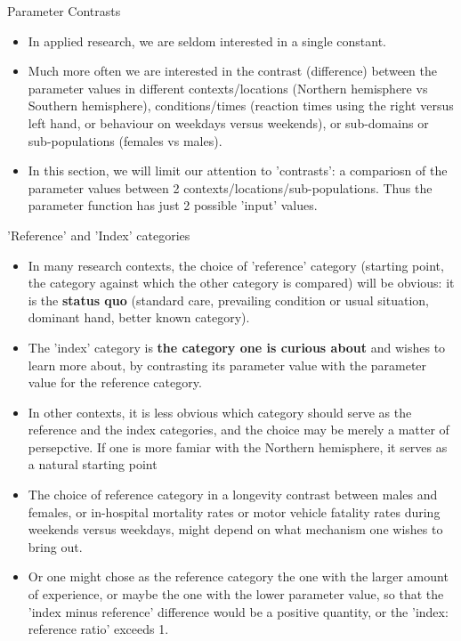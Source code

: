 \documentclass[10pt,handout]{beamer}\usepackage[]{graphicx}\usepackage[]{color}
\begin{document}
\begin{frame}{Parameter Contrasts}
	\begin{itemize}
		\item In applied research, we are seldom interested in a single constant. 
		
		
				\pause 
		
		\item Much more often we are interested in the contrast (difference) between the parameter values in different contexts/locations (Northern hemisphere vs Southern hemisphere), conditions/times (reaction times using the right versus left hand, or behaviour on weekdays versus weekends), or sub-domains or sub-populations (females vs males).
		
		\pause 
		
		\item In this section, we will limit our attention to 'contrasts': a compariosn of the parameter values between 2 contexts/locations/sub-populations. Thus the parameter function has just 2 possible 'input' values. 
	\end{itemize}
\end{frame}



\begin{frame}{'Reference' and 'Index' categories}
	\begin{itemize}
		\item In many research contexts, the choice of 'reference' category (starting point, the category against which the other category is compared) will be obvious: it is the \textbf{status quo} (standard care, prevailing condition or usual situation, dominant hand, better known category). 
		\pause 
		\item The 'index' category is \textbf{the category one is curious about} and wishes to learn more about, by contrasting its parameter value with the parameter value for the reference category.
		\pause 		
		\item In other contexts, it is less obvious which category should serve as the reference and the index categories, and the choice may be merely a matter of persepctive. If one is more famiar with the Northern hemisphere, it serves as a natural starting point 
		
				\pause 
		\item The choice of reference category in a longevity contrast between males and females, or in-hospital mortality rates or motor vehicle fatality rates during weekends versus weekdays, might depend on what mechanism one wishes to bring out. 
		
				\pause 
		\item Or one might chose as the reference category the one with the larger amount of experience, or maybe the one with the lower parameter value, so that the 'index minus reference' difference would be a positive quantity, or the 'index: reference ratio' exceeds 1.
	\end{itemize}
\end{frame}
\end{document}
